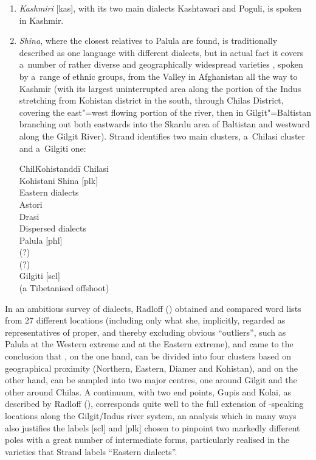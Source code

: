 \begin{enumerate}
\item \textit{Kashmiri} [kas], with its two main dialects Kashtawari and Poguli, is spoken in Kashmir. 


\item \textit{Shina}, where the closest relatives to Palula are found, is traditionally described as one language with different dialects, but in actual fact it covers a~number of rather diverse and geographically widespread varieties \citep[17]{schmidt1985}, spoken by a~range of ethnic groups, from the \iliKunar Valley in Afghanistan all the way to Kashmir (with its largest uninterrupted area along the portion of the Indus stretching from Kohistan district in the south, through Chilas District, covering the east"=west flowing portion of the river, then in Gilgit"=Baltistan branching out both eastwards into the Skardu area of Baltistan and westward along the Gilgit River). Strand identifies two main clusters, a~Chilasi cluster and a~Gilgiti one:

\begin{tabbing}
Chil\=Kohistanddi\=\kill
Chilasi \\
\>Kohistani Shina [plk] \\
\>Eastern dialects \\
\>\>Astori \\
\>\>Drasi \\
\>Dispersed dialects \\
\>\>Palula [phl] \\
\>\>\iliUshojo [ush] (?) \\
\>\>\iliKalkoti [xka] (?) \\
Gilgiti [scl] \\
\>\iliBrokskat [bkk] (a Tibetanised offshoot) \\
\end{tabbing}
\end{enumerate}

In an ambitious survey of \iliShina dialects, Radloff (\citeyear{radloff1992}) obtained and compared word lists from 27 different locations (including only what she, implicitly, regarded as representatives of \iliShina proper, and thereby excluding obvious ``outliers'', such as Palula at the Western extreme and \iliBrokskat at the Eastern extreme), and came to the conclusion that \iliShina, on the one hand, can be divided into four clusters based on geographical proximity (Northern, Eastern, Diamer and Kohistan), and on the other hand, can be sampled into two major centres, one around Gilgit and the other around Chilas. A continuum, with two end points, Gupis and Kolai, as described by Radloff (\citeyear[132]{radloff1992}), corresponds quite well to the full extension of \iliShina-speaking locations along the Gilgit/Indus river system, an analysis which in many ways also justifies the labels [scl] and [plk] chosen to pinpoint two markedly different poles with a great number of intermediate forms, particularly realised in the varieties that Strand labels ``Eastern dialects''.      


